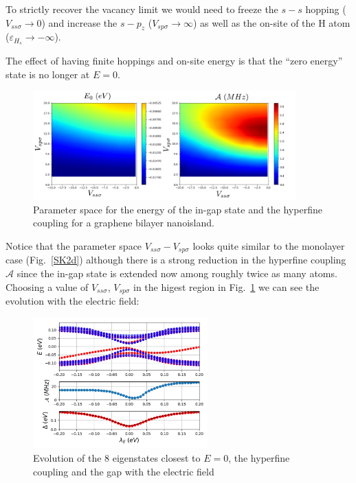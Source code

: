 To strictly recover the vacancy limit we would need to freeze the $s-s$ hopping ($V_{ss\sigma}\to0$) and increase the $s-p_z$ ($V_{sp\sigma}\to\infty$) as well as the on-site of the H atom ($\varepsilon_{H_s}\to-\infty$).

The effect of having finite hoppings and on-site energy is that the ``zero energy'' state is no longer at $E=0$.

\begin{figure}[h!]
  \centering
  \includegraphics[width=0.9\textwidth]{defects/fig/parameter_space_bi.pdf}
  \vspace{-5pt}
\caption{Parameter space for the energy of the in-gap state and the hyperfine coupling for a graphene bilayer nanoisland.}
\label{SK2d_bi}
\end{figure}
\FloatBarrier

Notice that the parameter space $V_{ss\sigma}-V_{sp\sigma}$ looks quite similar to the monolayer case (Fig.~\ref{SK2d}) although there is a strong reduction in the hyperfine coupling $\mathcal{A}$ since the in-gap state is extended now among roughly twice as many atoms.\\


Choosing a value of  $V_{ss\sigma}$, $V_{sp\sigma}$ in the higest region in Fig.~\ref{SK2d_bi} we can see the evolution with the electric field:
\begin{figure}[h!]
  \centering
  \includegraphics[width=0.6\textwidth]{defects/fig/best.pdf}
  \vspace{-5pt}
\caption{Evolution of the 8 eigenstates closest to $E=0$, the hyperfine coupling and the gap with the electric field}
\label{best}
\end{figure}
\FloatBarrier


